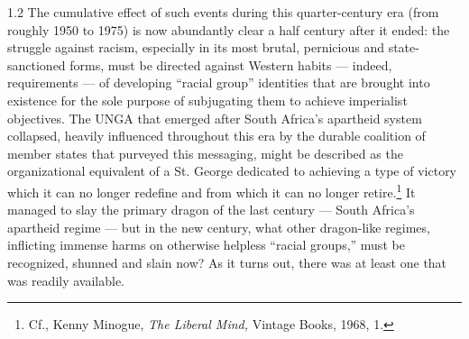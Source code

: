 \documentclass[../unravbook.tex]{subfiles}
\begin{document}
\begin{spacing}{1.2}
The cumulative effect of such events during this quarter-century era (from roughly 1950 to 1975) is now abundantly clear a half century after it ended: the struggle against racism, especially in its most brutal, pernicious and state-sanctioned forms, must be directed against Western habits --- indeed, requirements --- of developing \enquote{racial group} identities that are brought into existence for the sole purpose of subjugating them to achieve imperialist objectives. The UNGA that emerged after South Africa's apartheid system collapsed, heavily influenced throughout this era by the durable coalition of member states that purveyed this messaging, might be described as the organizational equivalent of a St. George dedicated to achieving a type of victory which it can no longer redefine and from which it can no longer retire.\footnote{Cf., Kenny Minogue, \textit{The Liberal Mind,} Vintage Books, 1968, 1.} It managed to slay the primary dragon of the last century --- South Africa's apartheid regime --- but in the new century, what other dragon-like regimes, inflicting immense harms on otherwise helpless \enquote{racial groups,} must be recognized, shunned and slain now? As it turns out, there was at least one that was readily available.

\clearpage
\parindent 0pt
\parskip 6pt

\end{spacing}

{\footnotesize
\printendnotes[paragraph]}

\thispagestyle{empty} %
\end{document}
